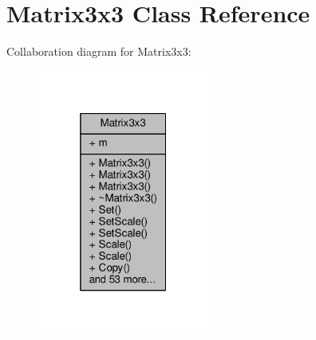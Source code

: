 \hypertarget{classMatrix3x3}{}\section{Matrix3x3 Class Reference}
\label{classMatrix3x3}


Collaboration diagram for Matrix3x3\+:
\nopagebreak
\begin{figure}[H]
\begin{center}
\leavevmode
\includegraphics[width=160pt]{d2/d27/classMatrix3x3__coll__graph}
\end{center}
\end{figure}
